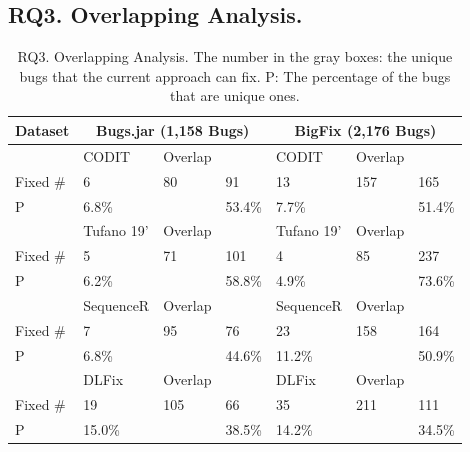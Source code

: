 \subsection{\bf RQ3. Overlapping Analysis.}



{\footnotesize{
\begin{table}[t]
	\caption{RQ3. Overlapping Analysis. The number in the gray boxes: the unique bugs that the current approach can fix. P: The percentage of the bugs that are unique ones.}
	\begin{center}
		\renewcommand{\arraystretch}{1}
		\begin{tabular}{p{0.8cm}<{\centering}|p{1.1cm}<{\centering}|p{0.8cm}<{\centering}|p{0.7cm}<{\centering}|p{1.1cm}<{\centering}|p{0.8cm}<{\centering}|p{0.7cm}<{\centering}}\hline
			Dataset&\multicolumn{3}{c|}{Bugs.jar (1,158 Bugs)}&\multicolumn{3}{c}{BigFix (2,176 Bugs)}\\
			\hline
			             & CODIT   & Overlap   & \tool  & CODIT   & Overlap   & \tool \\
			\hline
			Fixed \#     & \cellcolor{mygray} 6  & 80   & \cellcolor{mygray} 91  & \cellcolor{mygray} 13 &  157  & \cellcolor{mygray} 165 \\
			P            & 6.8\%   &    & 53.4\%  & 7.7\%   &    & 51.4\% \\
			\hline
			             & Tufano 19'   & Overlap   & \tool  & Tufano 19'   & Overlap   & \tool \\
			\hline
			Fixed \#     & \cellcolor{mygray} 5  &  71  & \cellcolor{mygray} 101 & \cellcolor{mygray}4 & 85   & \cellcolor{mygray}237 \\
			P            &  6.2\%  &    &  58.8\% &  4.9\%  &    & 73.6\% \\
			\hline
			             & SequenceR   & Overlap   & \tool  & SequenceR   & Overlap   & \tool \\
			\hline
			Fixed \#     & \cellcolor{mygray} 7  &   95 & \cellcolor{mygray} 76 & \cellcolor{mygray} 23 &  158  & \cellcolor{mygray} 164 \\
			P            &   6.8\% &    & 44.6\%  &   11.2\% &    & 50.9\% \\
			\hline
			             & DLFix   & Overlap   & \tool  & DLFix   & Overlap   & \tool \\
			\hline
			Fixed \#     & \cellcolor{mygray}  19 &  105  & \cellcolor{mygray} 66 & \cellcolor{mygray}35 &  211  & \cellcolor{mygray}111 \\
			P            &  15.0\%  &    & 38.5\%  &  14.2\%  &    &  34.5\%\\

\end{tabular}
\end{center}
\end{table}}}
